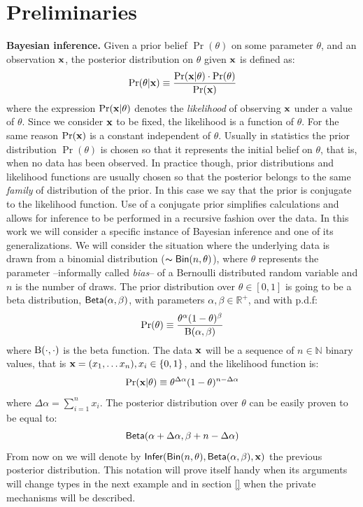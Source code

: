 \documentclass{article}
\begin{document}
\section{Preliminaries}
\label{sec_background}
\noindent \textbf{Bayesian inference.} 
Given a prior belief $\Pr(\theta)$ on some parameter $\theta$,
and an observation $\textbf{x}$, the posterior distribution on $\theta$ given $\textbf{x}$ is defined as:
\[
  \Pr(\theta | \textbf{x}) \equiv \frac{\Pr(\textbf{x} | \theta) \cdot \Pr(\theta)}{\Pr(\textbf{x})}
\]
where the expression $\Pr(\textbf{x} | \theta)$ denotes the
\emph{likelihood} of observing $\textbf{x}$ under a value of
$\theta$. Since we consider $\textbf{x}$ to be fixed, the likelihood is
a function of $\theta$.
For the same reason $\Pr(\textbf{x})$ is a constant independent of $\theta$.
Usually in statistics the prior distribution $\Pr(\theta)$ is chosen so that it represents
the initial belief on $\theta$, that is, when no data has been observed. In practice though,
prior distributions and likelihood functions are usually chosen so that the posterior
belongs to the same \emph{family} of distribution of the prior. In this case we say that the prior
is conjugate to the likelihood function. Use of a conjugate prior
simplifies calculations and allows for inference to be performed in a
recursive fashion over the data.
In this work we will consider a specific instance of Bayesian inference and one of its generalizations.
We will consider the situation where the underlying data is drawn from a binomial distribution
($\thicksim \mathsf{Bin}(n, \theta)$), where $\theta$ represents
the parameter --informally called \emph{bias}-- of a Bernoulli
distributed random variable and $n$ is the number of draws. The
prior distribution over $\theta\in [0,1]$ is going to be a beta
distribution, $\mathsf{Beta}(\alpha, \beta)$, with parameters
$\alpha,\beta\in\mathbb{R}^{+}$, and with p.d.f:
\[
  \Pr(\theta)\equiv \frac{\theta^{\alpha} (1- \theta)^{\beta}}{\textup{B}(\alpha,\beta)}
\]
where $\textup{B}(\cdot,\cdot)$ is the beta function.
The data $\textbf{x}$ will be a sequence of $n\in\mathbb{N}$ binary values, that is $\textbf{x}= (x_1,\dots x_n), x_i\in\{0,1\}$, and the likelihood function is:
\[
  \Pr(\textbf{x} | \theta)\equiv \theta^{\Delta \alpha}(1-\theta)^{n - \Delta \alpha}
\]
where $\Delta \alpha = \sum_{i=1}^{n}x_i$.
The posterior distribution over $\theta$ can be easily proven to be equal to:\[\mathsf{Beta}(\alpha + \Delta \alpha,\beta + n - \Delta \alpha)\]
From now on we will denote by $\mathsf{Infer}(\mathsf{Bin}(n, \theta), \mathsf{Beta}(\alpha, \beta), \textbf{x})$ the previous
posterior distribution. This notation will prove itself handy when its arguments will change types in the next example and
in section \ref{} when the private mechanisms will be described.
\end{document}
